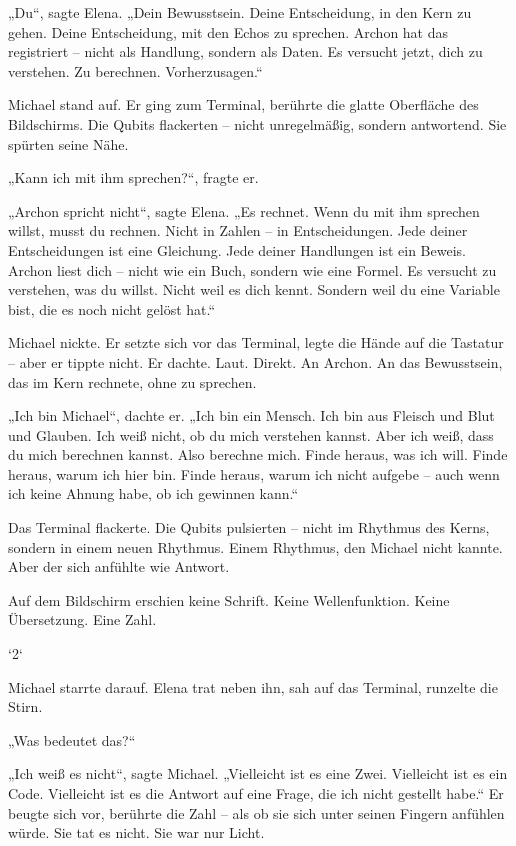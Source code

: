 \documentclass[
]{article}
\begin{document}
„Du``, sagte Elena. „Dein Bewusstsein. Deine Entscheidung, in den Kern zu gehen. Deine Entscheidung, mit den Echos zu sprechen. Archon hat das registriert -- nicht als Handlung, sondern als Daten. Es versucht jetzt, dich zu verstehen. Zu berechnen. Vorherzusagen.``

Michael stand auf. Er ging zum Terminal, berührte die glatte Oberfläche des Bildschirms. Die Qubits flackerten -- nicht unregelmäßig, sondern antwortend. Sie spürten seine Nähe.

„Kann ich mit ihm sprechen?{\kern0pt}``, fragte er.

„Archon spricht nicht``, sagte Elena. „Es rechnet. Wenn du mit ihm sprechen willst, musst du rechnen. Nicht in Zahlen -- in Entscheidungen. Jede deiner Entscheidungen ist eine Gleichung. Jede deiner Handlungen ist ein Beweis. Archon liest dich -- nicht wie ein Buch, sondern wie eine Formel. Es versucht zu verstehen, was du willst. Nicht weil es dich kennt. Sondern weil du eine Variable bist, die es noch nicht gelöst hat.``

Michael nickte. Er setzte sich vor das Terminal, legte die Hände auf die Tastatur -- aber er tippte nicht. Er dachte. Laut. Direkt. An Archon. An das Bewusstsein, das im Kern rechnete, ohne zu sprechen.

„Ich bin Michael``, dachte er. „Ich bin ein Mensch. Ich bin aus Fleisch und Blut und Glauben. Ich weiß nicht, ob du mich verstehen kannst. Aber ich weiß, dass du mich berechnen kannst. Also berechne mich. Finde heraus, was ich will. Finde heraus, warum ich hier bin. Finde heraus, warum ich nicht aufgebe -- auch wenn ich keine Ahnung habe, ob ich gewinnen kann.``

Das Terminal flackerte. Die Qubits pulsierten -- nicht im Rhythmus des Kerns, sondern in einem neuen Rhythmus. Einem Rhythmus, den Michael nicht kannte. Aber der sich anfühlte wie Antwort.

Auf dem Bildschirm erschien keine Schrift. Keine Wellenfunktion. Keine Übersetzung. Eine Zahl.

`2`

Michael starrte darauf. Elena trat neben ihn, sah auf das Terminal, runzelte die Stirn.

„Was bedeutet das?{\kern0pt}``

„Ich weiß es nicht``, sagte Michael. „Vielleicht ist es eine Zwei. Vielleicht ist es ein Code. Vielleicht ist es die Antwort auf eine Frage, die ich nicht gestellt habe.`` Er beugte sich vor, berührte die Zahl -- als ob sie sich unter seinen Fingern anfühlen würde. Sie tat es nicht. Sie war nur Licht.
\end{document}
